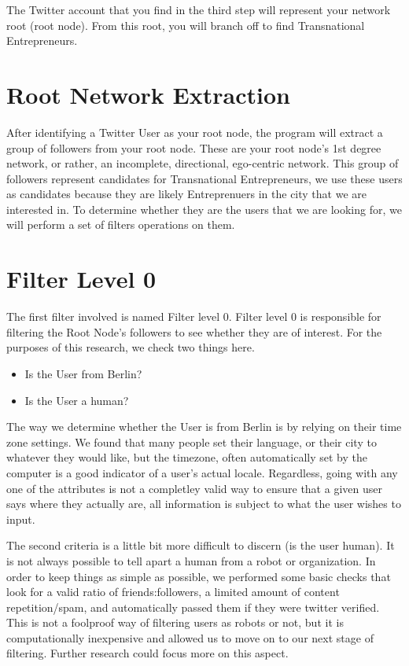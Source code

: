 The Twitter account that you find in the third step will represent
your network root (root node). From this root, you will branch off to
find Transnational Entrepreneurs.

\section{Root Network Extraction}
After identifying a Twitter User as your root node, the program will
extract a group of followers from your root node. These are your root
node's 1st degree network, or rather, an incomplete, directional,
ego-centric network. This group of followers represent candidates for
Transnational Entrepreneurs, we use these users as candidates because
they are likely Entreprenuers in the city that we are interested in.
To determine whether they are the users that we are looking for, we
will perform a set of filters operations on them.

\section{Filter Level 0}
The first filter involved is named Filter level 0. Filter level 0 is
responsible for filtering the Root Node's followers to see whether
they are of interest. For the purposes of this research, we check two
things here.

\begin{itemize}
\item Is the User from Berlin?
\item Is the User a human?
\end{itemize}

The way we determine whether the User is from Berlin is by relying on
their time zone settings. We found that many people set their
language, or their city to whatever they would like, but the timezone,
often automatically set by the computer is a good indicator of a
user's actual locale. Regardless, going with any one of the attributes
is not a completley valid way to ensure that a given user says where
they actually are, all information is subject to what the user wishes
to input.

The second criteria is a little bit more difficult to discern (is the
user human). It is not always possible to tell apart a human from a
robot or organization. In order to keep things as simple as possible,
we performed some basic checks that look for a valid ratio of
friends:followers, a limited amount of content repetition/spam, and
automatically passed them if they were twitter verified. This is not a
foolproof way of filtering users as robots or not, but it is
computationally inexpensive and allowed us to move on to our next
stage of filtering. Further research could focus more on this aspect.

